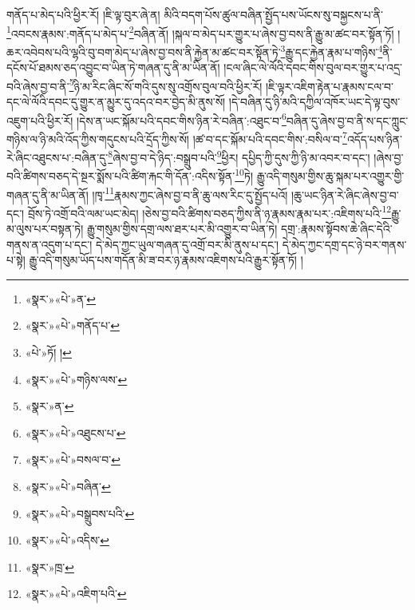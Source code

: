 གནོད་པ་མེད་པའི་ཕྱིར་རོ། །ཇི་ལྟ་བུར་ཞེ་ན། མིའི་བདག་པོས་ཚུལ་བཞིན་སྤྱོད་པས་ཡོངས་སུ་བསྐྱངས་པ་ནི་\footnote{«སྣར་»«པེ་»ན་}འབངས་རྣམས་:གནོད་པ་མེད་པ་\footnote{«སྣར་»«པེ་»གནོད་པ་}བཞིན་ནོ། །སྐལ་བ་མེད་པར་གྱུར་པ་ཞེས་བྱ་བས་ནི་རྒྱུ་མ་ཚང་བར་སྟོན་ཏོ། །ཆར་འབེབས་པའི་ལྷའི་བུ་བག་མེད་པ་ཞེས་བྱ་བས་ནི་རྐྱེན་མ་ཚང་བར་སྟོན་ཏེ་\footnote{«པེ་»ཏོ། །}རྒྱུ་དང་རྐྱེན་རྣམ་པ་གཉིས་\footnote{«སྣར་»«པེ་»གཉིས་ལས་}ནི་དངོས་པོ་ཐམས་ཅད་འབྱུང་བ་ཡིན་ཏེ་གཞན་དུ་ནི་མ་ཡིན་ནོ། །ངལ་ཞིང་ལེ་ལོའི་དབང་གིས་བུལ་བར་གྱུར་པ་འདྲ་བའི་ཞེས་བྱ་བ་ནི་\footnote{«སྣར་»ན་}ཉི་མ་རིང་ཞིང་སོ་གའི་དུས་སུ་འགྲོས་བུལ་བའི་ཕྱིར་རོ། །ཇི་ལྟར་འཇིག་རྟེན་པ་རྣམས་ངལ་བ་དང་ལེ་ལོའི་དབང་དུ་གྱུར་ན་མྱུར་དུ་འདའ་བར་བྱེད་མི་ནུས་སོ། །དེ་བཞིན་དུ་ཉི་མའི་དཀྱིལ་འཁོར་ཡང་དེ་ལྟ་བུས་འཇུག་པའི་ཕྱིར་རོ། །དེས་ན་ཡང་སྐོམ་པའི་དབང་གིས་ཉིན་རེ་བཞིན་:འཐུང་བ་\footnote{«སྣར་»«པེ་»འཐུངས་པ་}བཞིན་དུ་ཞེས་བྱ་བ་ནི་ས་དང་ཀླུང་གཉིས་ལ་ཉི་མའི་འོད་ཀྱིས་གདུངས་པའི་དྲོད་ཀྱིས་སོ། །ཚ་བ་དང་སྐོམ་པའི་དབང་གིས་:བསིལ་བ་\footnote{«སྣར་»«པེ་»བསལ་བ་}འདོད་པས་ཉིན་རེ་ཞིང་འཐུངས་པ་:བཞིན་དུ་\footnote{«སྣར་»«པེ་»བཞིན་}ཞེས་བྱ་བ་དེ་ཉིད་:བསྒྲུབ་པའི་\footnote{«སྣར་»«པེ་»བསྒྲུབས་པའི་}ཕྱིར། དཔྱིད་ཀྱི་དུས་ཀྱི་ཉི་མ་འབར་བ་དང་། །ཞེས་བྱ་བའི་ཚིགས་བཅད་དེ་སྔར་སྨོས་པའི་ཚིག་རྐང་གི་དོན་:འདིས་སྟོན་\footnote{«སྣར་»«པེ་»འདིས་}ཏེ། རྒྱུ་འདི་གསུམ་གྱིས་ཆུ་སྐམ་པར་འགྱུར་གྱི་གཞན་དུ་ནི་མ་ཡིན་ནོ། །ཁྭ་\footnote{«སྣར་»ཁྲ་}རྣམས་ཀྱང་ཞེས་བྱ་བ་ནི་ཆུ་ལས་རིང་དུ་སྤྱོད་པའོ། །ཆུ་ཡང་ཉིན་རེ་ཞིང་ཞེས་བྱ་བ་དང་། བྲོས་ཏེ་འགྲོ་བའི་ལམ་ཡང་མེད། །ཅེས་བྱ་བའི་ཚིགས་བཅད་ཀྱིས་ནི་ཉ་རྣམས་རྣམ་པར་:འཇིགས་པའི་\footnote{«སྣར་»«པེ་»འཇིག་པའི་}རྒྱུ་མ་ལུས་པར་བསྟན་ཏེ། རྒྱུ་གསུམ་གྱིས་དགྲ་ལས་ཐར་པར་མི་འགྱུར་བ་ཡིན་ཏེ། དགྲ་:རྣམས་སྟོབས་ཆེ་ཞིང་དེའི་གནས་ན་འདུག་པ་དང་། དེ་མེད་ཀྱང་ཡུལ་གཞན་དུ་འགྲོ་བར་མི་ནུས་པ་དང་། དེ་མེད་ཀྱང་དགྲ་དང་ཉེ་བར་གནས་པ་སྟེ། རྒྱུ་འདི་གསུམ་ཡོད་པས་གདོན་མི་ཟ་བར་ཉ་རྣམས་འཇིགས་པའི་རྒྱུར་སྟོན་ཏོ། །
